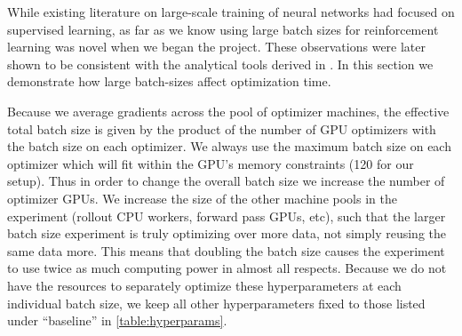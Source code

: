 \documentclass[ocean-paper.tex]{subfiles}
\begin{document}
While existing literature on large-scale training of neural networks had focused on supervised learning, as far as we know using large batch sizes for reinforcement learning was novel when we began the \dota project.
These observations were later shown to be consistent with the analytical tools derived in \cite{mccandlish2018empirical}. 
In this section we demonstrate how large batch-sizes affect optimization time.

Because we average gradients across the pool of optimizer machines, the effective total batch size is given by the product of the number of GPU optimizers with the batch size on each optimizer. 
We always use the maximum batch size on each optimizer which will fit within the GPU's memory constraints (120 for our setup). 
Thus in order to change the overall batch size we increase the number of optimizer GPUs. 
We increase the size of the other machine pools in the experiment (rollout CPU workers, forward pass GPUs, etc), such that the larger batch size experiment is truly optimizing over more data, not simply reusing the same data more. 
This means that doubling the batch size causes the experiment to use twice as much computing power in almost all respects.
Because we do not have the resources to separately optimize these hyperparameters at each individual batch size, we keep all other hyperparameters fixed to those listed under ``baseline'' in \autoref{table:hyperparams}.


\end{document}
